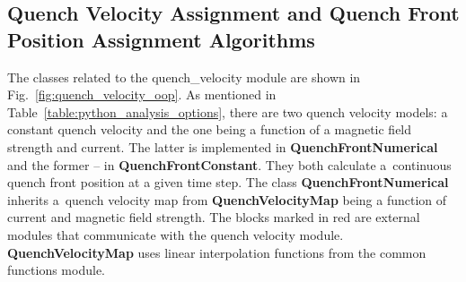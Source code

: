 \subsection{Quench Velocity Assignment and Quench Front Position Assignment Algorithms}

The classes related to the quench\_velocity module are shown in Fig.~\ref{fig:quench_velocity_oop}. As mentioned in Table~\ref{table:python_analysis_options}, there are two quench velocity models: a constant quench velocity and the one being a function of a magnetic field strength and current. The latter is implemented in \textbf{QuenchFrontNumerical} and the former -- in \textbf{QuenchFrontConstant}. They both calculate a~continuous quench front position at a given time step. The class \textbf{QuenchFrontNumerical} inherits a~quench velocity map from \textbf{QuenchVelocityMap} being a function of current and magnetic field strength. The blocks marked in red are external modules that communicate with the quench velocity module. \textbf{QuenchVelocityMap} uses linear interpolation functions from the common functions module. 

